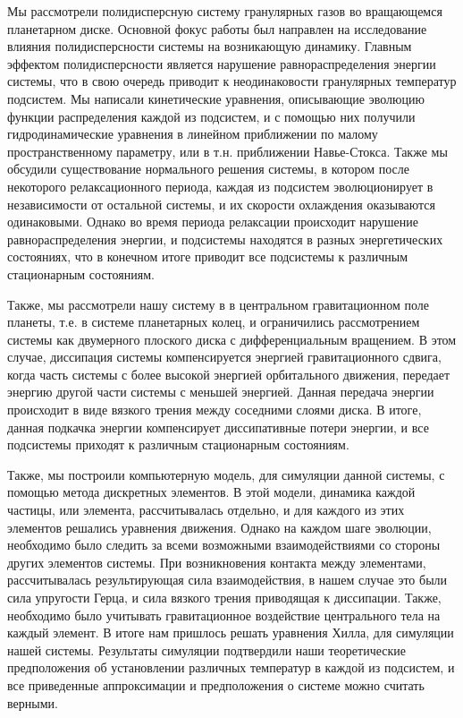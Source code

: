 \Conclusion %
Мы рассмотрели полидисперсную систему гранулярных газов во вращающемся планетарном диске. Основной фокус работы был направлен на 
исследование влияния полидисперсности системы на возникающую динамику. Главным эффектом полидисперсности является нарушение 
равнораспределения энергии системы, что в свою очередь приводит к неодинаковости гранулярных температур подсистем. 
Мы написали кинетические уравнения, описывающие эволюцию функции распределения каждой из подсистем, и с помощью них получили
гидродинамические уравнения в линейном приближении по малому пространственному параметру, или в т.н. приближении Навье-Стокса.
Также мы обсудили существование нормального решения системы, в котором после некоторого релаксационного периода, каждая
из подсистем эволюционирует в независимости от остальной системы, и их скорости охлаждения оказываются одинаковыми. Однако 
во время периода релаксации происходит нарушение равнораспределения энергии, и подсистемы находятся в разных энергетических состояниях,
что в конечном итоге приводит все подсистемы к различным стационарным состояниям. 

Также, мы рассмотрели нашу систему в в центральном гравитационном поле планеты, т.е. в системе планетарных колец, и ограничились 
рассмотрением системы как двумерного плоского диска с дифференциальным вращением. В этом случае, диссипация системы компенсируется
энергией гравитационного сдвига, когда часть системы с более высокой энергией орбитального движения, передает энергию другой части
системы с меньшей энергией. Данная передача энергии происходит в виде вязкого трения между соседними слоями диска. В итоге, 
данная подкачка энергии компенсирует диссипативные потери энергии, и все подсистемы приходят к различным стационарным состояниям.

Также, мы построили компьютерную модель, для симуляции данной системы, с помощью метода дискретных элементов. В этой модели,
динамика каждой частицы, или элемента, рассчитывалась отдельно, и для каждого из этих элементов решались уравнения движения.
Однако на каждом шаге эволюции, необходимо было следить за всеми возможными взаимодействиями со стороны других элементов системы.
При возникновения контакта между элементами, рассчитывалась результирующая сила взаимодействия, в нашем случае это были
сила упругости Герца, и сила вязкого трения приводящая к диссипации. Также, необходимо было учитывать гравитационное воздействие
центрального тела на каждый элемент. В итоге нам пришлось решать уравнения Хилла, для симуляции нашей системы. Результаты 
симуляции подтвердили наши теоретические предположения об установлении различных температур в каждой из подсистем, 
и все приведенные аппроксимации и предположения о системе можно считать верными.

